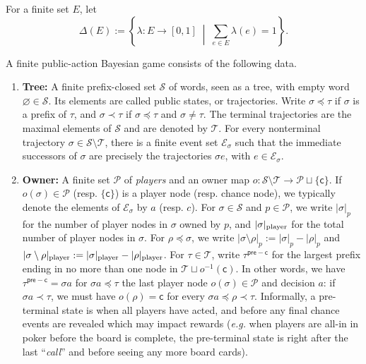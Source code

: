 \documentclass[12pt, a4paper]{article}
\begin{document}
\begin{definition}\label{def:finite-pbg}
For a finite set $E$, let
\begin{equation}\label{eq:probability-simplex}
\Delta(E):=\left\{\lambda:E\to[0,1]\;\middle|\;\sum_{e\in E}\lambda(e)=1\right\}.
\end{equation}

A finite public-action Bayesian game consists of the following data.
\begin{enumerate}[label =(\roman*)]
    \item \textbf{Tree:} A finite prefix-closed set $\mathcal S$ of words, seen as a tree, with empty word $\varnothing\in\mathcal S$.
    Its elements are called public states, or trajectories.
    Write $\sigma\preccurlyeq\tau$ if $\sigma$ is a prefix of $\tau$, and $\sigma\prec\tau$ if $\sigma\preccurlyeq\tau$ and $\sigma\neq\tau$.
    The terminal trajectories are the maximal elements of $\mathcal S$ and are denoted by $\mathcal T$.
    For every nonterminal trajectory $\sigma\in\mathcal S\setminus\mathcal T$, there is a finite event set $\mathcal E_\sigma$ such that the immediate successors of $\sigma$ are precisely the trajectories $\sigma e$, with $e\in\mathcal E_\sigma$.

    \item \textbf{Owner:} A finite set $\mathcal{P}$ of \textit{players} and an owner map $o:\mathcal S\setminus\mathcal T \to \mathcal{P}\sqcup\{\mathsf c\}$.
    If $o(\sigma)\in\mathcal P$ (resp. $\{\mathsf c\}$) is a player node (resp. chance node), we typically denote the elements of $\mathcal{E}_\sigma$ by $a$ (resp. $c$).
    For $\sigma \in \mathcal S$ and $p \in \mathcal P$, we write $|\sigma|_p$ for the number of player nodes in $\sigma$ owned by $p$, and $|\sigma|_{\textnormal{player}}$ for the total number of player nodes in $\sigma$.
    For $\rho\preccurlyeq\sigma$, we write $|\sigma\setminus\rho|_p:=|\sigma|_p-|\rho|_p$ and $|\sigma\setminus\rho|_{\textnormal{player}}:=|\sigma|_{\textnormal{player}}-|\rho|_{\textnormal{player}}$.
    For $\tau \in \mathcal{T}$, write $\tau^{\mathsf{pre-c}}$ for the largest prefix ending in no more than one node in $\mathcal{T} \sqcup o^{-1}(\mathsf{c})$.
    In other words, we have $\tau^{\mathsf{pre-c}} = \sigma a$ for $\sigma a \preccurlyeq \tau$ the last player node $o(\sigma) \in \mathcal{P}$ and decision $a$: if $\sigma a \prec \tau$, we must have $o(\rho) = \mathsf{c}$ for every $\sigma a \preccurlyeq \rho \prec \tau$.
    Informally, a pre-terminal state is when all players have acted, and before any final chance events are revealed which may impact rewards (\textit{e.g.} when players are all-in in poker before the board is complete, the pre-terminal state is right after the last ``\textit{call}'' and before seeing any more board cards).


\end{enumerate}
\end{definition}
\end{document}
